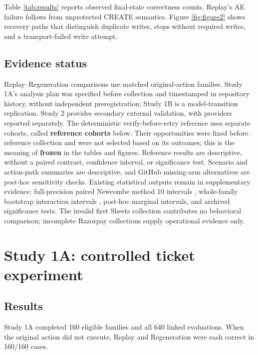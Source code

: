 \documentclass[conference]{IEEEtran}
\begin{document}
Table \ref{tab:results} reports observed final-state correctness counts. Replay's AE failure follows from unprotected CREATE semantics. Figure \ref{fig:figure2} shows recovery paths that distinguish duplicate writes, stops without required writes, and a transport-failed write attempt.


\subsection{Evidence status}

Replay--Regeneration comparisons use matched original-action families. Study 1A's analysis plan was specified before collection and timestamped in repository history, without independent preregistration; Study 1B is a model-transition replication. Study 2 provides secondary external validation, with providers reported separately. The deterministic verify-before-retry reference uses separate cohorts, called \textbf{reference cohorts} below. Their opportunities were fixed before reference collection and were not selected based on its outcomes; this is the meaning of \textbf{frozen} in the tables and figures. Reference results are descriptive, without a paired contrast, confidence interval, or significance test. Scenario and action-path summaries are descriptive, and GitHub missing-arm alternatives are post-hoc sensitivity checks. Existing statistical outputs remain in supplementary evidence: full-precision paired Newcombe method 10 intervals \cite{newcombe}, whole-family bootstrap interaction intervals \cite{efron_bootstrap}, post-hoc marginal intervals, and archived significance tests. The invalid first Sheets collection contributes no behavioral comparison; incomplete Razorpay collections supply operational evidence only.






\section{Study 1A: controlled ticket experiment}

\subsection{Results}

Study 1A completed 160 eligible families and all 640 linked evaluations. When the original action did not execute, Replay and Regeneration were each correct in 160/160 cases.
\end{document}
